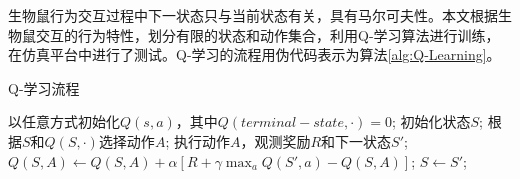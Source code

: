 


生物鼠行为交互过程中下一状态只与当前状态有关，具有马尔可夫性。本文根据生物鼠交互的行为特性，划分有限的状态和动作集合，利用Q-学习算法进行训练，在仿真平台中进行了测试。Q-学习的流程用伪代码表示为算法\ref{alg:Q-Learning}。
\begin{algorithm}[htb]
  \caption{Q-学习流程}
  \label{alg:Q-Learning}
  \begin{algorithmic}[1]
    \State 以任意方式初始化$Q(s, a)$，其中$Q(terminal-state, ·)=0$;
        \State 初始化状态$S$;
        \State 根据$S$和$Q(S, ·)$选择动作$A$;
        \State 执行动作$A$，观测奖励$R$和下一状态$S'$;
        \State $Q(S, A)\gets Q(S, A)+\alpha\left[R+\gamma\max_{a}Q(S', a)-Q(S, A)\right]$;
        \State $S\gets S'$;
        \EndWhile
    \EndForEach
  \end{algorithmic}
\end{algorithm} 
